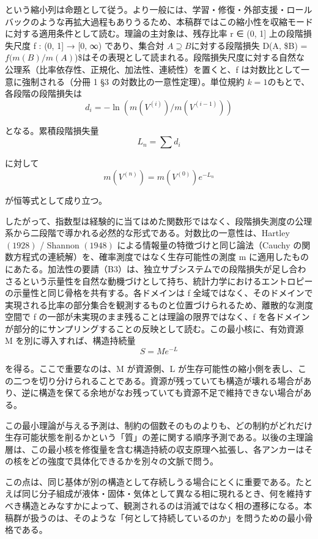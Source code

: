 \documentclass[12pt,a4paper]{article}
\begin{document}
という縮小列は命題として従う。より一般には、学習・修復・外部支援・ロールバックのような再拡大過程もありうるため、本稿群ではこの縮小性を収縮モードに対する適用条件として読む。理論の主対象は、残存比率 r ∈ (0, 1{]} 上の段階損失尺度 f : (0, 1{]} → {[}0, ∞) であり、集合対 \(A \supseteq B\)に対する段階損失 D(A, \$B) = \(f(m(B)/m(A)\))\$はその表現として読まれる。段階損失尺度に対する自然な公理系（比率依存性、正規化、加法性、連続性）を置くと、f は対数比として一意に強制される（分冊 1 §3 の対数比の一意性定理）。単位規約 \(k = 1\)のもとで、各段階の段階損失は \[
d_{i} = -\ln( m(V^{(i)}) / m(V^{(i-1)}) )
\]

となる。累積段階損失量 \[
L_{n} = \sum d_{i}
\]

に対して \[
m(V^{(n)}) = m(V^{(0)}) e^{-L_{n}}
\]

が恒等式として成り立つ。

したがって、指数型は経験的に当てはめた関数形ではなく、段階損失測度の公理系から二段階で導かれる必然的な形式である。対数比の一意性は、Hartley \((1928)\) / Shannon \((1948)\) による情報量の特徴づけと同じ論法（Cauchy の関数方程式の連続解）を、確率測度ではなく生存可能性の測度 m に適用したものにあたる。加法性の要請（B3）は、独立サブシステムでの段階損失が足し合わさるという示量性を自然な動機づけとして持ち、統計力学におけるエントロピーの示量性と同じ骨格を共有する。各ドメインは f 全域ではなく、そのドメインで実現される比率の部分集合を観測するものと位置づけられるため、離散的な測度空間で f の一部が未実現のまま残ることは理論の限界ではなく、f を各ドメインが部分的にサンプリングすることの反映として読む。この最小核に、有効資源 M を別に導入すれば、構造持続量 \[
S = M e^{-L}
\]

を得る。ここで重要なのは、M が資源側、L が生存可能性の縮小側を表し、この二つを切り分けられることである。資源が残っていても構造が壊れる場合があり、逆に構造を保てる余地がなお残っていても資源不足で維持できない場合がある。

この最小理論が与える予測は、制約の個数そのものよりも、どの制約がどれだけ生存可能状態を削るかという「質」の差に関する順序予測である。以後の主理論層は、この最小核を修復量を含む構造持続の収支原理へ拡張し、各アンカーはその核をどの強度で具体化できるかを別々の文脈で問う。

この点は、同じ基体が別の構造として存続しうる場合にとくに重要である。たとえば同じ分子組成が液体・固体・気体として異なる相に現れるとき、何を維持すべき構造とみなすかによって、観測されるのは消滅ではなく相の遷移になる。本稿群が扱うのは、そのような「何として持続しているのか」を問うための最小骨格である。
\end{document}
